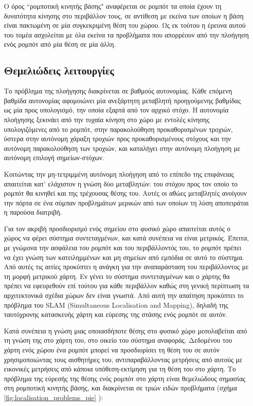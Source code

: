 Ο όρος ``ρομποτική κινητής βάσης" αναφέρεται σε ρομπότ τα οποία έχουν τη
δυνατότητα κίνησης στο περιβάλλον τους, σε αντίθεση με εκείνα των οποίων η βάση
είναι πακτωμένη σε μία συγκεκριμένη θέση του χώρου. Ως εκ τούτου η έρευνα αυτού
του τομέα ασχολείται με όλα εκείνα τα προβλήματα που απορρέουν από την πλοήγηση
ενός ρομπότ από μία θέση σε μία άλλη.


\subsection{Θεμελιώδεις λειτουργίες}
\label{subsec:01_01_01_1}

Το πρόβλημα της πλοήγησης διακρίνεται σε βαθμούς αυτονομίας. Κάθε επόμενη
βαθμίδα αυτονομίας αφομοιώνει μία ανεξάρτητη μεταβλητή προηγούμενης βαθμίδας ως
μία προς υπολογισμό, την οποία εξαρτά από τον αρχικό στόχο. Η αυτονομία
πλοήγησης ξεκινάει από την τυχαία κίνηση στο χώρο με εντολές κίνησης
υπολογιζόμενες από το ρομπότ, στην παρακολούθηση προκαθορισμένων τροχιών,
ύστερα στην αυτόνομη χάραξη τροχιών προς προκαθορισμένους στόχους και την
αυτόνομη παρακολούθηση των τροχιών, και καταλήγει στην αυτόνομη πλοήγηση με
αυτόνομη επιλογή σημείων-στόχων.

Κοιτώντας την μη-τετριμμένη αυτόνομη πλοήγηση από το επίπεδο της επιφάνειας
απαιτείται κατ' ελάχιστον η γνώση δύο μεταβλητών: του στόχου προς τον οποίο το
ρομπότ θα κινηθεί και της τρέχουσας θέσης του. Αυτές οι αθώες μεταβλητές
ανοίγουν την πόρτα σε ένα σύμπαν προβλημάτων μερικών από των οποίων τη λύση
αποπειράται η παρούσα διατριβή.

Για τον ακριβή προσδιορισμό ενός σημείου στο φυσικό χώρο απαιτείται αυτός ο
χώρος να φέρει σύστημα συντεταγμένων, και κατά συνέπεια να είναι μετρικός.
Έπειτα, με γνώμονα την ασφάλεια του ρομπότ και του περιβάλλοντός του, το ρομπότ
πρέπει να έχει γνώση των κατειλημμένων και μη σημείων από εμπόδια σε αυτό το
σύστημα. Από αυτές τις αιτίες προκύπτει η ανάγκη για την αναπαράσταση του
περιβάλλοντος με τη μορφή μετρικού χάρτη. Εν γένει το σύστημα συντεταγμένων και
ο χάρτης θα πρέπει να εφευρεθούν επί τούτου για κάθε περιβάλλον καθώς στη
γενική περίπτωση τα αρχιτεκτονικά σχέδια χώρων δεν είναι γνωστά. Από αυτή την
απαίτηση προκύπτει το πρόβλημα του SLAM (Simultaneous Localisation and
Mapping), δηλαδή της ταυτόχρονης κατασκευής χάρτη και εύρεσης της στάσης ενός
ρομπότ σε αυτόν.

Κατά συνέπεια η γνώση μιας οποιασδήποτε θέσης στο φυσικό χώρο μεσολαβείται από
τη γνώση της στο χάρτη του, στο οικείο του σύστημα αναφοράς. Δεδομένου του
χάρτη ενός χώρου ένα ρομπότ μπορεί να προσδιορίσει τη θέση του σε αυτόν
χρησιμοποιώντας τους αισθητήρες του, αντιπαραβάλλοντας μετρήσεις από αυτούς με
εικονικές μετρήσεις από κάποια υπόθεση-εκτίμηση για τη θέση του στο χάρτη. Το
πρόβλημα της εύρεσής της θέσης ενός ρομπότ στο χάρτη είναι θεμελιώδους
σημασίας στη ρομποτική κινητής βάσης, και διακρίνεται σε τριών ειδών προβλήματα
(σχήμα \ref{fig:localisation_problems_pie} \cite{Panigrahi2021}):

